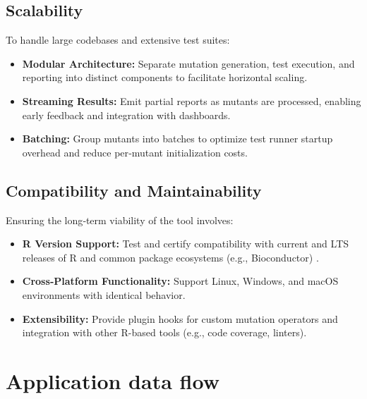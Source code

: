 \subsection{Scalability}
To handle large codebases and extensive test suites:
\begin{itemize}
  \item \textbf{Modular Architecture:} Separate mutation generation, test execution, and reporting into distinct components to facilitate horizontal scaling.
  \item \textbf{Streaming Results:} Emit partial reports as mutants are processed, enabling early feedback and integration with dashboards.
  \item \textbf{Batching:} Group mutants into batches to optimize test runner startup overhead and reduce per‐mutant initialization costs.
\end{itemize}

\subsection{Compatibility and Maintainability}
Ensuring the long‐term viability of the tool involves:
\begin{itemize}
  \item \textbf{R Version Support:} Test and certify compatibility with current and LTS releases of R and common package ecosystems (e.g., Bioconductor) \cite{gentleman2004bioconductor}.
  \item \textbf{Cross‐Platform Functionality:} Support Linux, Windows, and macOS environments with identical behavior.
  \item \textbf{Extensibility:} Provide plugin hooks for custom mutation operators and integration with other R-based tools (e.g., code coverage, linters).
\end{itemize}

\section{Application data flow}


